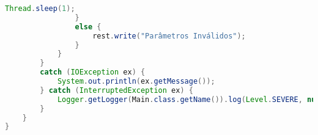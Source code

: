 \begin{lstlisting}[language=java, frame=single]
                    Thread.sleep(1);
                }
                else {
                    rest.write("Parâmetros Inválidos");
                }
            }
        }
        catch (IOException ex) {
            System.out.println(ex.getMessage());
        } catch (InterruptedException ex) {
            Logger.getLogger(Main.class.getName()).log(Level.SEVERE, null, ex);
        }
    }
}

\end{lstlisting}

